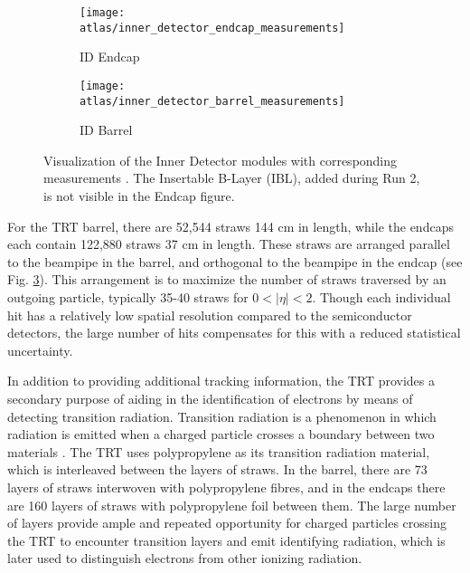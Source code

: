             \begin{figure}
                \begin{subfigure}{.48\textwidth}
                    \texttt{[image: atlas/inner\_detector\_endcap\_measurements]}
                    \caption{ID Endcap}
                    \label{fig:inner_detector_endcap_measurements}
                \end{subfigure}
                \begin{subfigure}{.48\textwidth}
                    \texttt{[image: atlas/inner\_detector\_barrel\_measurements]}
                    \caption{ID Barrel}
                    \label{fig:inner_detector_barrel_measurements}
                \end{subfigure}
                \caption{Visualization of the Inner Detector modules with corresponding measurements \cite{atlas_tdr} \cite{sensor_damage}.
                    The Insertable B-Layer (IBL), added during Run 2, is not visible in the Endcap figure.}
                \label{fig:inner_detector_measurements}
            \end{figure}

            For the TRT barrel, there are 52,544 straws 144 cm in length, while the endcaps each contain 122,880 straws 37 cm in length.
            These straws are arranged parallel to the beampipe in the barrel, and orthogonal to the beampipe in the endcap (see Fig. \ref{fig:inner_detector_measurements}).
            This arrangement is to maximize the number of straws traversed by an outgoing particle, typically 35-40 straws for $0 < |\eta| < 2$.
            Though each individual hit has a relatively low spatial resolution compared to the semiconductor detectors, the large number of hits compensates for this with a reduced statistical uncertainty.

            In addition to providing additional tracking information, the TRT provides a secondary purpose of aiding in the identification of electrons by means of detecting transition radiation. 
            Transition radiation is a phenomenon in which radiation is emitted when a charged particle crosses a boundary between two materials \cite{transition_radiation}.
            The TRT uses polypropylene as its transition radiation material, which is interleaved between the layers of straws.
            In the barrel, there are 73 layers of straws interwoven with polypropylene fibres, and in the endcaps there are 160 layers of straws with polypropylene foil between them.
            The large number of layers provide ample and repeated opportunity for charged particles crossing the TRT to encounter transition layers and emit identifying radiation, which is later used to distinguish electrons from other ionizing radiation.


